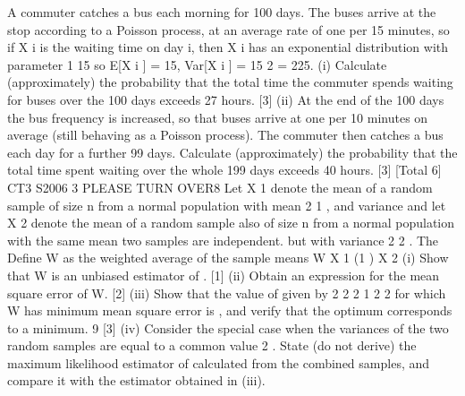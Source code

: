 \documentclass[a4paper,12pt]{article}
\begin{document}
\begin{enumerate}
A commuter catches a bus each morning for 100 days. The buses arrive at the stop
according to a Poisson process, at an average rate of one per 15 minutes, so if X i is the
waiting time on day i, then X i has an exponential distribution with parameter
1
15
so
E[X i ] = 15, Var[X i ] = 15 2 = 225.
(i) Calculate (approximately) the probability that the total time the commuter
spends waiting for buses over the 100 days exceeds 27 hours.
[3]
(ii) At the end of the 100 days the bus frequency is increased, so that buses arrive
at one per 10 minutes on average (still behaving as a Poisson process). The
commuter then catches a bus each day for a further 99 days. Calculate
(approximately) the probability that the total time spent waiting over the
whole 199 days exceeds 40 hours.
[3]
[Total 6]
CT3 S2006
3
PLEASE TURN OVER8
Let X 1 denote the mean of a random sample of size n from a normal population with
mean
2
1 ,
and variance
and let X 2 denote the mean of a random sample also of
size n from a normal population with the same mean
two samples are independent.
but with variance
2
2 .
The
Define W as the weighted average of the sample means
W
X 1 (1
) X 2
(i) Show that W is an unbiased estimator of . [1]
(ii) Obtain an expression for the mean square error of W. [2]
(iii) Show that the value of
given by
2
2
2
1
2
2
for which W has minimum mean square error is
,
and verify that the optimum corresponds to a minimum.
9
[3]
(iv) Consider the special case when the variances of the two random samples are
equal to a common value 2 . State (do not derive) the maximum likelihood
estimator of calculated from the combined samples, and compare it with the
estimator obtained in (iii).



\end{enumerate}
\end{document}
